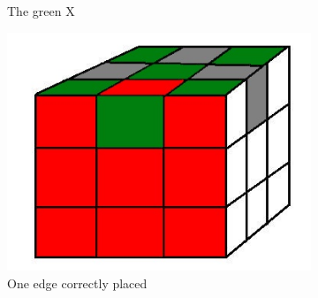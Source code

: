 \documentclass[a4paper,11pt]{kth-mag}
\begin{document}
\begin{figure}[bh]
\begin{subfigure}[!b]{0.3\textwidth}
		\caption{The green X}
		\label{fig_13}
	\end{subfigure}
	\begin{subfigure}[!b]{0.3\textwidth}
		\includegraphics[width=\textwidth]{figs/last-edge-correct.jpg}
		\caption{One edge correctly placed}
		\label{fig_14}
	\end{subfigure}
	\caption{}
\end{figure}
\end{document}
